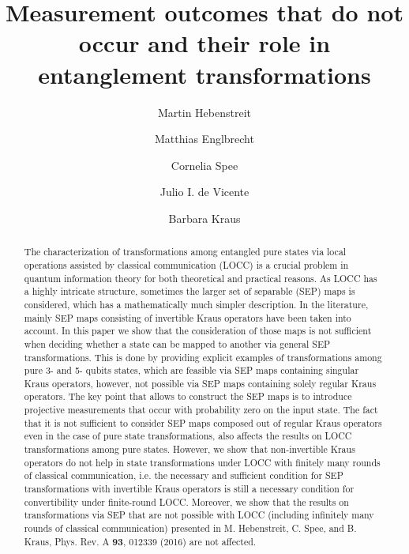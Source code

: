\documentclass[superscriptaddress,twocolumn]{revtex4}\usepackage[utf8]{inputenc}
\begin{document}
\title{Measurement outcomes that do not occur and their role in entanglement transformations}


\author{Martin Hebenstreit}
\author{Matthias Englbrecht}
\author{Cornelia Spee}
\author{Julio I. de Vicente}
\author{Barbara Kraus}




\begin{abstract}
The characterization of transformations among entangled pure states via local operations assisted by classical communication (LOCC) is a crucial problem in quantum information theory for both theoretical and practical reasons. As LOCC has a highly intricate structure, sometimes the larger set of separable (SEP) maps is considered, which has a mathematically much simpler description. In the literature, mainly SEP maps consisting of invertible Kraus operators have been taken into account. In this paper we show that the consideration of those maps is not sufficient when deciding whether a state can be mapped to another via general SEP transformations. This is done by providing explicit examples of transformations among pure 3- and 5- qubits states, which are feasible via SEP maps containing singular Kraus operators, however, not possible via SEP maps containing solely regular Kraus operators. The key point that allows to construct the SEP maps is to introduce projective measurements that occur with probability zero on the input state. The fact that it is not sufficient to consider SEP maps composed out of regular Kraus operators even in the case of pure state transformations, also affects the results on LOCC transformations among pure states. However, we show that non-invertible Kraus operators do not help in state transformations under LOCC with finitely many rounds of classical communication, i.e. the necessary and sufficient condition for SEP transformations with invertible Kraus operators is still a necessary condition for convertibility under finite-round LOCC. Moreover, we show that the results on transformations via SEP that are not possible with LOCC (including infinitely many rounds of classical communication) presented in M. Hebenstreit, C. Spee, and B. Kraus, Phys. Rev. A \textbf{93}, 012339 (2016) are not affected.
\end{abstract}
\end{document}

